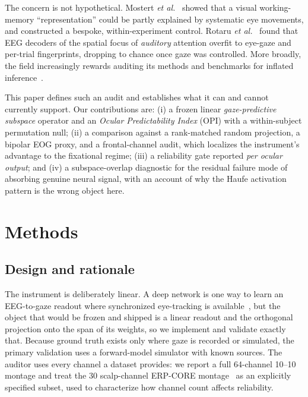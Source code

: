 \documentclass[conference]{IEEEtran}
\begin{document}
The concern is not hypothetical. Mostert \emph{et al.}~\cite{mostert2018eye} showed that a
visual working-memory ``representation'' could be partly explained by systematic eye movements,
and constructed a bespoke, within-experiment control. Rotaru
\emph{et al.}~\cite{rotaru2024decoding} found that EEG decoders of the spatial focus of
\emph{auditory} attention overfit to eye-gaze and per-trial fingerprints, dropping to chance
once gaze was controlled. More broadly, the field increasingly rewards auditing its methods and
benchmarks for inflated
inference~\cite{kapoor2023leakage,brookshire2024leakage,chaibubneto2018permutations}.

This paper defines such an audit and establishes what it can and cannot currently support. Our
contributions are: (i) a frozen linear \emph{gaze-predictive subspace} operator and an
\emph{Ocular Predictability Index} (OPI) with a within-subject permutation null; (ii) a comparison
against a rank-matched random projection, a bipolar EOG proxy, and a frontal-channel audit, which
localizes the instrument's advantage to the fixational regime; (iii) a reliability gate reported
\emph{per ocular output}; and (iv) a subspace-overlap diagnostic for the residual failure mode of
absorbing genuine neural signal, with an account of why the Haufe activation pattern is the wrong
object here.

\section{Methods}

\subsection{Design and rationale}

The instrument is deliberately linear. A deep network is one way to learn an EEG-to-gaze readout
where synchronized eye-tracking is available~\cite{kastrati2021eegeyenet,hollenstein2018zuco}, but
the object that would be frozen and shipped is a linear readout and the orthogonal projection onto
the span of its weights, so we implement and validate exactly that. Because ground truth exists
only where gaze is recorded or simulated, the primary validation uses a forward-model simulator
with known sources. The auditor uses every channel a dataset provides: we report a full 64-channel
10--10 montage and treat the 30 scalp-channel ERP-CORE montage~\cite{kappenman2021erpcore} as an
explicitly specified subset, used to characterize how channel count affects reliability.
\end{document}
